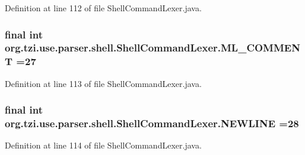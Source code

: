 Definition at line 112 of file Shell\-Command\-Lexer.\-java.

\hypertarget{classorg_1_1tzi_1_1use_1_1parser_1_1shell_1_1_shell_command_lexer_a697533bd7d95ebf5bb0febfcc146b037}{
\subsubsection[{M\-L\-\_\-\-C\-O\-M\-M\-E\-N\-T}]{\setlength{\rightskip}{0pt plus 5cm}final int org.\-tzi.\-use.\-parser.\-shell.\-Shell\-Command\-Lexer.\-M\-L\-\_\-\-C\-O\-M\-M\-E\-N\-T =27\hspace{0.3cm}{\ttfamily [static]}}}\label{classorg_1_1tzi_1_1use_1_1parser_1_1shell_1_1_shell_command_lexer_a697533bd7d95ebf5bb0febfcc146b037}


Definition at line 113 of file Shell\-Command\-Lexer.\-java.

\hypertarget{classorg_1_1tzi_1_1use_1_1parser_1_1shell_1_1_shell_command_lexer_a5205cd54f62909fe42d369a78bb75d68}{
\subsubsection[{N\-E\-W\-L\-I\-N\-E}]{\setlength{\rightskip}{0pt plus 5cm}final int org.\-tzi.\-use.\-parser.\-shell.\-Shell\-Command\-Lexer.\-N\-E\-W\-L\-I\-N\-E =28\hspace{0.3cm}{\ttfamily [static]}}}\label{classorg_1_1tzi_1_1use_1_1parser_1_1shell_1_1_shell_command_lexer_a5205cd54f62909fe42d369a78bb75d68}


Definition at line 114 of file Shell\-Command\-Lexer.\-java.

